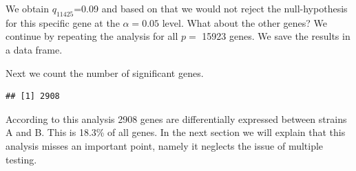 \documentclass[
]{book}
\newenvironment{Shaded}{\begin{snugshade}}{\end{snugshade}}
\newcommand{\AttributeTok}[1]{\textcolor[rgb]{0.77,0.63,0.00}{#1}}
\newcommand{\ConstantTok}[1]{\textcolor[rgb]{0.00,0.00,0.00}{#1}}
\newcommand{\ControlFlowTok}[1]{\textcolor[rgb]{0.13,0.29,0.53}{\textbf{#1}}}
\newcommand{\DecValTok}[1]{\textcolor[rgb]{0.00,0.00,0.81}{#1}}
\newcommand{\FloatTok}[1]{\textcolor[rgb]{0.00,0.00,0.81}{#1}}
\newcommand{\FunctionTok}[1]{\textcolor[rgb]{0.00,0.00,0.00}{#1}}
\newcommand{\NormalTok}[1]{#1}
\newcommand{\OtherTok}[1]{\textcolor[rgb]{0.56,0.35,0.01}{#1}}
\newcommand{\SpecialCharTok}[1]{\textcolor[rgb]{0.00,0.00,0.00}{#1}}
\begin{document}
We obtain \(q_{11425}\)=0.09 and based on that we would not reject the null-hypothesis for this specific gene at the \(\alpha=0.05\) level. What about the other genes? We continue by repeating the analysis for all \(p=\) 15923 genes. We save the results in a data frame.

\begin{Shaded}
\end{Shaded}

Next we count the number of significant genes.

\begin{Shaded}
\end{Shaded}

\begin{verbatim}
## [1] 2908
\end{verbatim}

According to this analysis 2908 genes are differentially expressed between strains A and B. This is 18.3\% of all genes. In the next section we will explain that this analysis misses an important point, namely it neglects the issue of multiple testing.
\end{document}
